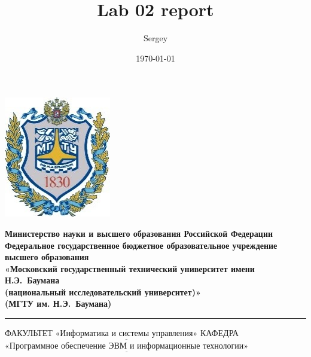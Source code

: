 

\title{Lab 02 report}
\author{Sergey}

\date{\today}


\thispagestyle{empty}

\noindent \begin{minipage}{0.15\textwidth}
	\includegraphics[width=\linewidth]{b_logo}
\end{minipage}
\noindent\begin{minipage}{0.85\textwidth}\centering
	\textbf{Министерство науки и высшего образования Российской Федерации}\\
	\textbf{Федеральное государственное бюджетное образовательное учреждение высшего образования}\\
	\textbf{«Московский государственный технический университет имени Н.Э.~Баумана}\\
	\textbf{(национальный исследовательский университет)»}\\
	\textbf{(МГТУ им. Н.Э.~Баумана)}
\end{minipage}

\noindent\rule{16cm}{3pt}
\newline\newline
\noindent ФАКУЛЬТЕТ $\underline{\text{«Информатика и системы управления»}}$ \newline\newline
\noindent КАФЕДРА $\underline{\text{«Программное обеспечение ЭВМ и информационные технологии»}}$\newline


